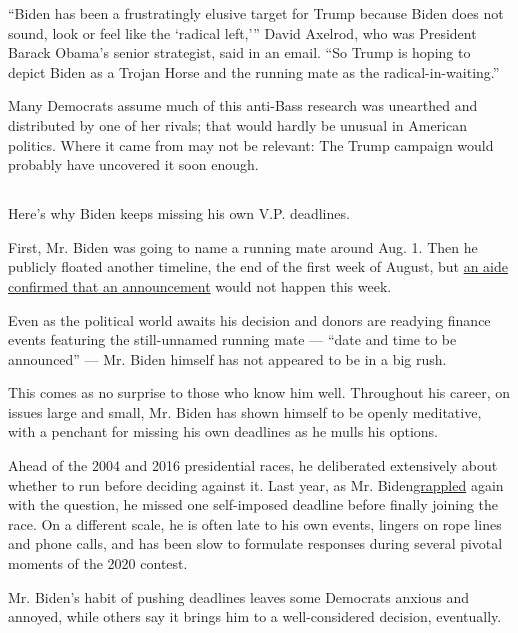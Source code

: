 ``Biden has been a frustratingly elusive target for Trump because Biden
does not sound, look or feel like the `radical left,''' David Axelrod,
who was President Barack Obama's senior strategist, said in an email.
``So Trump is hoping to depict Biden as a Trojan Horse and the running
mate as the radical-in-waiting.''

Many Democrats assume much of this anti-Bass research was unearthed and
distributed by one of her rivals; that would hardly be unusual in
American politics. Where it came from may not be relevant: The Trump
campaign would probably have uncovered it soon enough.

\hypertarget{-2}{%
\subsection{}\label{-2}}

Here's why Biden keeps missing his own V.P. deadlines.

First, Mr. Biden was going to name a running mate around Aug. 1. Then he
publicly floated another timeline, the end of the first week of August,
but
\href{https://www.nytimes3xbfgragh.onion/2020/08/07/us/politics/joe-biden-vice-presidential-search.html}{an
aide confirmed that an announcement} would not happen this week.

Even as the political world awaits his decision and donors are readying
finance events featuring the still-unnamed running mate --- ``date and
time to be announced'' --- Mr. Biden himself has not appeared to be in a
big rush.

This comes as no surprise to those who know him well. Throughout his
career, on issues large and small, Mr. Biden has shown himself to be
openly meditative, with a penchant for missing his own deadlines as he
mulls his options.

Ahead of the 2004 and 2016 presidential races, he deliberated
extensively about whether to run before deciding against it. Last year,
as Mr.
Biden\href{https://www.nytimes3xbfgragh.onion/2019/03/07/us/politics/biden-2020.html}{grappled}
again with the question, he missed one self-imposed deadline before
finally joining the race. On a different scale, he is often late to his
own events, lingers on rope lines and phone calls, and has been slow to
formulate responses during several pivotal moments of the 2020 contest.

Mr. Biden's habit of pushing deadlines leaves some Democrats anxious and
annoyed, while others say it brings him to a well-considered decision,
eventually.

